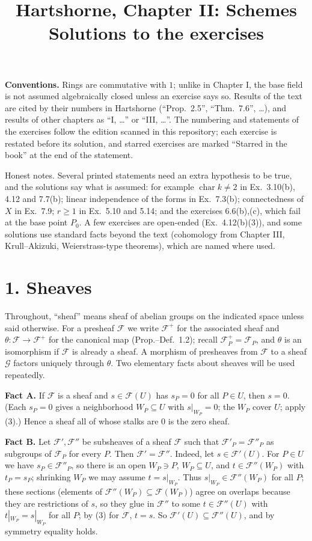 \documentclass[11pt]{article}
\title{Hartshorne, Chapter II: Schemes\\[2pt]\large Solutions to the exercises}
\author{}
\date{}
\begin{document}
\maketitle
\noindent\textbf{Conventions.} Rings are commutative with $1$; unlike in Chapter I, the base field is not assumed algebraically closed unless an exercise says so. Results of the text are cited by their numbers in Hartshorne (``Prop.~2.5'', ``Thm.~7.6'', \dots), and results of other chapters as ``I, \dots'' or ``III, \dots''. The numbering and statements of the exercises follow the edition scanned in this repository; each exercise is restated before its solution, and starred exercises are marked ``Starred in the book'' at the end of the statement.

Honest notes. Several printed statements need an extra hypothesis to be true, and the solutions say what is assumed: for example $\operatorname{char}k\neq2$ in Ex.~3.10(b), 4.12 and 7.7(b); linear independence of the forms in Ex.~7.3(b); connectedness of $X$ in Ex.~7.9; $r\ge1$ in Ex.~5.10 and 5.14; and the exercises 6.6(b),(c), which fail at the base point $P_0$. A few exercises are open-ended (Ex.~4.12(b)(3)), and some solutions use standard facts beyond the text (cohomology from Chapter III, Krull--Akizuki, Weierstrass-type theorems), which are named where used.

\section*{1. Sheaves}

Throughout, ``sheaf'' means sheaf of abelian groups on the indicated space unless said otherwise. For a presheaf $\mathcal F$ we write $\mathcal F^+$ for the associated sheaf and $\theta\colon\mathcal F\to\mathcal F^+$ for the canonical map (Prop.--Def.~1.2); recall $\mathcal F^+_P=\mathcal F_P$, and $\theta$ is an isomorphism if $\mathcal F$ is already a sheaf. A morphism of presheaves from $\mathcal F$ to a sheaf $\mathcal G$ factors uniquely through $\theta$. Two elementary facts about sheaves will be used repeatedly.

\medskip
\noindent\textbf{Fact A.} If $\mathcal F$ is a sheaf and $s\in\mathcal F(U)$ has $s_P=0$ for all $P\in U$, then $s=0$. (Each $s_P=0$ gives a neighborhood $W_P\subseteq U$ with $s|_{W_P}=0$; the $W_P$ cover $U$; apply (3).) Hence a sheaf all of whose stalks are $0$ is the zero sheaf.

\medskip
\noindent\textbf{Fact B.} Let $\mathcal F',\mathcal F''$ be subsheaves of a sheaf $\mathcal F$ such that $\mathcal F'_P=\mathcal F''_P$ as subgroups of $\mathcal F_P$ for every $P$. Then $\mathcal F'=\mathcal F''$. Indeed, let $s\in\mathcal F'(U)$. For $P\in U$ we have $s_P\in\mathcal F''_P$, so there is an open $W_P\ni P$, $W_P\subseteq U$, and $t\in\mathcal F''(W_P)$ with $t_P=s_P$; shrinking $W_P$ we may assume $t=s|_{W_P}$. Thus $s|_{W_P}\in\mathcal F''(W_P)$ for all $P$; these sections (elements of $\mathcal F''(W_P)\subseteq \mathcal F(W_P)$) agree on overlaps because they are restrictions of $s$, so they glue in $\mathcal F''$ to some $t\in\mathcal F''(U)$ with $t|_{W_P}=s|_{W_P}$ for all $P$; by (3) for $\mathcal F$, $t=s$. So $\mathcal F'(U)\subseteq\mathcal F''(U)$, and by symmetry equality holds.
\end{document}
